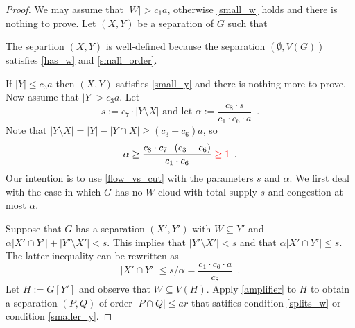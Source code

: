 \documentclass{patmorin}
\begin{document}
\begin{proof}
  We may assume that $|W|>c_1a$, otherwise \cref{small_w} holds and there is nothing to prove. Let $(X,Y)$ be a separation of $G$ such that
  The separtion $(X,Y)$ is well-defined because the separation $(\emptyset,V(G))$ satisfies \cref{has_w} and \cref{small_order}.

  If $|Y|\le c_3a$ then $(X,Y)$ satisfies \cref{small_y} and there is nothing more to prove.  Now assume that $|Y|> c_3a$. Let
  \[
      s:=c_7\cdot |Y\setminus X|\text{ and let }\alpha:=\frac{c_8\cdot s}{c_1\cdot c_6\cdot a}\enspace.
  \]
  Note that $|Y\setminus X|= |Y|-|Y\cap X|\ge (c_3-c_6)a$, so
  \[
     \alpha \ge \frac{c_8\cdot c_7\cdot(c_3-c_6)}{c_1\cdot c_6} \mathcolor{red}{\ge 1} \enspace . \\
  \]
  Our intention is to use \cref{flow_vs_cut} with the parameters $s$ and $\alpha$. We first deal with the case in which $G$ has no $W$-cloud with total supply $s$ and congestion at most $\alpha$.

  Suppose that $G$ has a separation $(X',Y')$ with $W\subseteq Y'$ and $\alpha |X'\cap Y'|+|Y'\setminus X'|< s$.  This implies that $|Y'\setminus X'|<s$ and that  $\alpha|X'\cap Y'|\le s$.  The latter inequality can be rewritten as
  \[
      |X'\cap Y'|\le s/\alpha = \frac{c_1\cdot c_6\cdot a}{c_8} \enspace .
  \]
  Let $H:=G[Y']$ and observe that $W\subseteq V(H)$.
  Apply \cref{amplifier} to $H$ to obtain a separation $(P,Q)$ of order $|P\cap Q|\le ar$ that satifies condition \cref{splits_w} or condition \cref{smaller_y}.


\end{proof}
\end{document}
